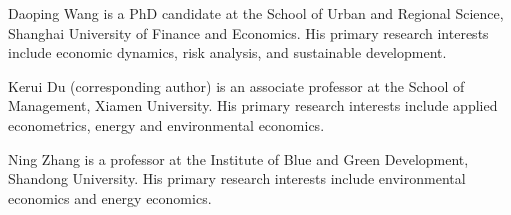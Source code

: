%
%








\begin{aboutauthors}
	Daoping Wang is a PhD candidate at the School of Urban and Regional Science, Shanghai University of Finance and Economics. His primary research interests include economic dynamics, risk analysis, and sustainable development.
	
	Kerui Du (corresponding author) is an associate professor at the School of Management, Xiamen University. His primary research interests include applied econometrics, energy and environmental economics.	
	
	Ning Zhang is a professor at the Institute of Blue and Green Development, Shandong University. His primary research interests include environmental economics and energy economics.
\end{aboutauthors}


\endinput
